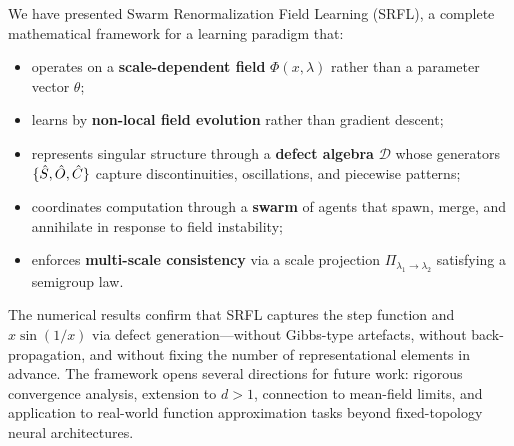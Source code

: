 \documentclass[12pt,a4paper]{article}
\theoremstyle{plain}
\theoremstyle{definition}
\theoremstyle{remark}
\newcommand{\cD}{\mathcal{D}}
\DeclarePairedDelimiter{\set}{\{}{\}}
\begin{document}
We have presented Swarm Renormalization Field Learning (SRFL), a
complete mathematical framework for a learning paradigm that:
\begin{itemize}
  \item operates on a \textbf{scale-dependent field} $\Phi(x,\lambda)$
    rather than a parameter vector $\theta$;
  \item learns by \textbf{non-local field evolution} rather than
    gradient descent;
  \item represents singular structure through a \textbf{defect algebra}
    $\cD$ whose generators $\set{\hat{S}, \hat{O}, \hat{C}}$ capture
    discontinuities, oscillations, and piecewise patterns;
  \item coordinates computation through a \textbf{swarm} of agents that
    spawn, merge, and annihilate in response to field instability;
  \item enforces \textbf{multi-scale consistency} via a scale projection
    $\Pi_{\lambda_1\to\lambda_2}$ satisfying a semigroup law.
\end{itemize}

The numerical results confirm that SRFL captures the step function and
$x\sin(1/x)$ via defect generation—without Gibbs-type artefacts, without
back-propagation, and without fixing the number of representational
elements in advance.  The framework opens several directions for future
work: rigorous convergence analysis, extension to $d > 1$, connection to
mean-field limits, and application to real-world function approximation
tasks beyond fixed-topology neural architectures.
\end{document}
